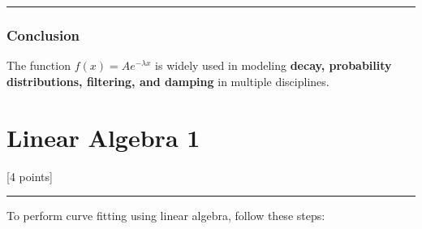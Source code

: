 \documentclass[11pt]{article}
\begin{document}
\begin{center}\rule{0.5\linewidth}{0.5pt}\end{center}

\subsubsection{\texorpdfstring{\textbf{Conclusion}}{Conclusion}}\label{conclusion}

The function \(f(x) = A e^{-\lambda x}\) is widely used in modeling
\textbf{decay, probability distributions, filtering, and damping} in
multiple disciplines.

    \section{Linear Algebra 1}\label{linear-algebra-1}

{[}4 points{]}

    \begin{center}\rule{0.5\linewidth}{0.5pt}\end{center}

To perform curve fitting using linear algebra, follow these steps:
\end{document}
